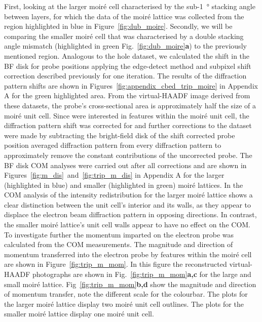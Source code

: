 First, looking at the larger moiré cell characterised by the sub-\SI{1}{\degree} stacking angle between layers, for which the
data of the moiré lattice was collected from the region highlighted in blue in Figure~\ref{fig:dub_moire}.
Secondly, we will be comparing the smaller moiré cell that was characterised by a double stacking angle mismatch (highlighted in green Fig.~\ref{fig:dub_moire}\textbf{a}) to the previously mentioned region.
%
Analogous to the hole dataset, we calculated the shift in the BF disk for probe positions applying the edge-detect method and subpixel shift correction described previously for one iteration.
%
The results of the diffraction pattern shifts are shown in Figures~\ref{fig:appendix_cbed_trip_moire} in Appendix A for the green highlighted area.
%
From the virtual-HAADF image derived from these datasets, the probe's cross-sectional area is approximately half the size of a moiré unit cell. 
%
Since were interested in features within the moiré unit cell, the diffraction pattern shift was corrected for and further corrections to the dataset were made by subtracting the bright-field disk of the shift corrected probe position averaged diffraction pattern from every diffraction pattern to approximately remove the constant contributions of the uncorrected probe.
%
The BF disk COM analyses were carried out after all corrections and are shown in Figures~\ref{fig:m_dis}~and~\ref{fig:trip_m_dis} in Appendix A for the larger (highlighted in blue) and smaller (highlighted in green) moiré lattices.
%
In the COM analysis of the intensity redistribution for the larger moiré lattice shows a clear distinction between the unit cell's interior and its walls, as they appear to displace the electron beam diffraction pattern in opposing directions.
%
In contrast, the smaller moiré lattice's unit cell walls appear to have no effect on the COM.
%
To investigate further the momentum imparted on the electron probe was calculated from the COM measurements.
%
The magnitude and direction of momentum transferred into the electron probe by features within the moiré cell are shown in Figure~\ref{fig:trip_m_mom}. In this figure the reconstructed virtual-HAADF photographs are shown in Fig.~\ref{fig:trip_m_mom}\textbf{a,c} for the large and small moiré lattice. Fig~\ref{fig:trip_m_mom}\textbf{b,d} show the magnitude and direction of momentum transfer, note the different scale for the colourbar. The plots for the larger moiré lattice display two moiré unit cell outlines. The plots for the smaller moiré lattice display one moiré unit cell.
%
